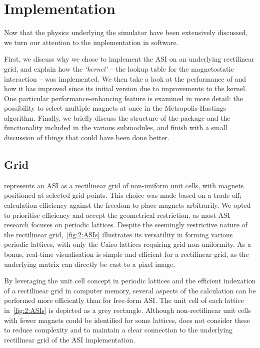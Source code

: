 \section{Implementation}\label{sec:2:Implementation}
Now that the physics underlying the simulator have been extensively discussed, we turn our attention to the implementation in software. \par
First, we discuss why we chose to implement the ASI on an underlying rectilinear grid, and explain how the \textit{`kernel'} -- the lookup table for the magnetostatic interaction -- was implemented.
We then take a look at the performance of \hotspice and how it has improved since its initial version due to improvements to the kernel.
One particular performance-enhancing feature is examined in more detail: the possibility to select multiple magnets at once in the Metropolis-Hastings algorithm.
Finally, we briefly discuss the structure of the package and the functionality included in the various submodules, and finish with a small discussion of things that could have been done better.

\subsection{Grid}
\hotspice{} represents an ASI as a rectilinear grid of non-uniform unit cells, with magnets positioned at selected grid points.
This choice was made based on a trade-off; calculation efficiency against the freedom to place magnets arbitrarily.
We opted to prioritise efficiency and accept the geometrical restriction, as most ASI research focuses on periodic lattices.
Despite the seemingly restrictive nature of the rectilinear grid,~\cref{fig:2:ASIs} illustrates its versatility in forming various periodic lattices, with only the Cairo lattices requiring grid non-uniformity.
As a bonus, real-time visualisation is simple and efficient for a rectilinear grid, as the underlying matrix can directly be cast to a pixel image. \par
By leveraging the unit cell concept in periodic lattices and the efficient indexation of a rectilinear grid in computer memory, several aspects of the calculation can be performed more efficiently than for free-form ASI. The unit cell of each lattice in~\cref{fig:2:ASIs} is depicted as a grey rectangle. Although non-rectilinear unit cells with fewer magnets could be identified for some lattices, \hotspice{} does not consider these to reduce complexity and to maintain a clear connection to the underlying rectilinear grid of the ASI implementation.

